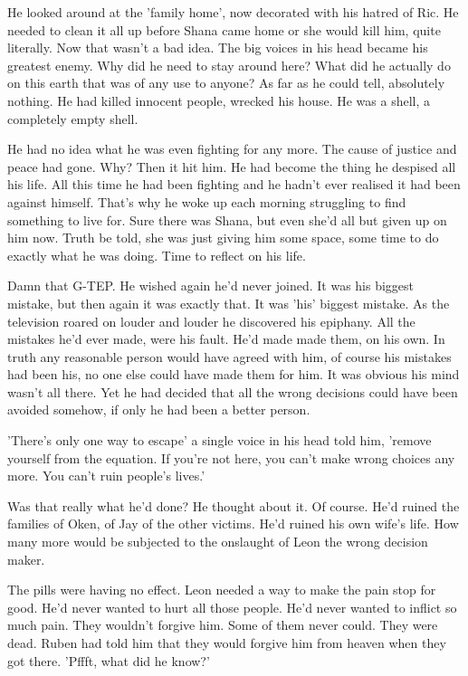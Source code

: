 He looked around at the 'family home', now decorated with his hatred of Ric.  He needed to clean it all up before Shana came home or she would kill him, quite literally.  Now that wasn't a bad idea.  The big voices in his head became his greatest enemy.  Why did he need to stay around here?  What did he actually do on this earth that was of any use to anyone?  As far as he could tell, absolutely nothing.  He had killed innocent people, wrecked his house.  He was a shell, a completely empty shell.

He had no idea what he was even fighting for any more.  The  cause of justice and peace had gone.  Why?  Then it hit him.  He had become the thing he despised all his life.  All this time he had been fighting and he hadn't ever realised it had been against himself.  That's why he woke up each morning struggling to find something to live for.  Sure there was Shana, but even she'd all but given up on him now.  Truth be told, she was just giving him some space, some time to do exactly what he was doing.  Time to reflect on his life.

Damn that G-TEP.  He wished again he'd never joined.  It was his biggest mistake, but then again it was exactly that.  It was 'his' biggest mistake.  As the television roared on louder and louder he discovered his epiphany.  All the mistakes he'd ever made, were his fault.  He'd made made them, on his own.  In truth any reasonable person would have agreed with him, of course his mistakes had been his, no one else could have made them for him.  It was obvious his mind wasn't all there.  Yet he had decided that all the wrong decisions could have been avoided somehow, if only he had been a better person.

'There's only one way to escape' a single voice in his head told him, 'remove yourself from the equation.  If you're not here, you can't make wrong choices any more.  You can't ruin people's lives.'

Was that really what he'd done?  He thought about it.  Of course.  He'd ruined the families of Oken, of Jay of the other victims.  He'd ruined his own wife's life.  How many more would be subjected to the onslaught of Leon the wrong decision maker.  

The pills were having no effect.  Leon needed a way to make the pain stop for good.  He'd never wanted to hurt all those people.  He'd never wanted to inflict so much pain.  They wouldn't forgive him.  Some of them never could.  They were dead.  Ruben had told him that they would forgive him from heaven when they got there.  'Pffft, what did he know?'


